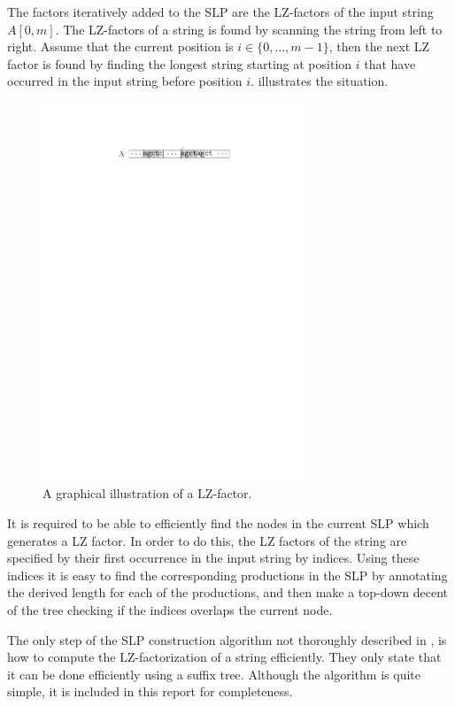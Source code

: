 \documentclass[twoside,11pt,openright]{report}
\newcommand{\str}[3]{#1[#2, #3]}
\begin{document}
The factors iteratively added to the SLP are the LZ-factors of the input string $\str{A}{0}{m}$. The LZ-factors of a string is found by scanning the string from left to right. Assume that the current position is $i \in \{0, \dots, m - 1\}$, then the next LZ factor is found by finding the longest string starting at position $i$ that have occurred in the input string before position $i$.  illustrates the situation.

\begin{figure}[!htb]
  \centering
  \includegraphics[width=8cm]{images/lz-factor}
  \caption{A graphical illustration of a LZ-factor.}
  \label{fig:lz-factor}
\end{figure}

It is required to be able to efficiently find the nodes in the current SLP which generates a LZ factor. In order to do this, the LZ factors of the string are specified by their first occurrence in the input string by indices. Using these indices it is easy to find the corresponding productions in the SLP by annotating the derived length for each of the productions, and then make a top-down decent of the tree checking if the indices overlaps the current node.

The only step of the SLP construction algorithm not thoroughly described in \cite{Rytter2003211}, is how to compute the LZ-factorization of a string efficiently. They only state that it can be done efficiently using a suffix tree. Although the algorithm is quite simple, it is included in this report for completeness.
\end{document}
